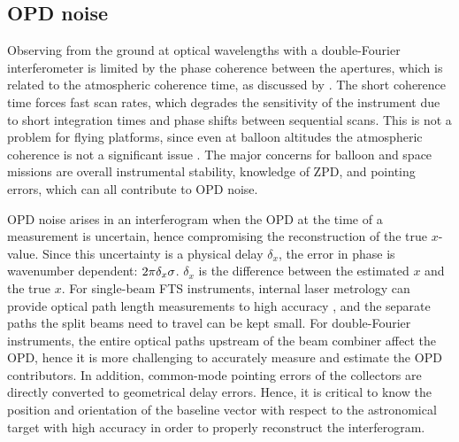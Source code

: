 \subsection{OPD noise}
\label{subsec:phnoise}
Observing from the ground at optical wavelengths with a double-Fourier interferometer is limited by the phase coherence 
between the apertures, which is related to the atmospheric coherence time, as discussed by \cite{Mariotti:1988vea}. The short coherence time forces fast scan rates, which degrades the sensitivity of the instrument due to short integration times and phase shifts between sequential scans. 
This is not a problem for flying platforms, since even at balloon altitudes the atmospheric coherence is not a significant 
issue \citep{Rizzo:2012jp}. The major concerns for balloon and space missions are overall instrumental stability, knowledge of ZPD, and pointing errors, which can all contribute to OPD noise.

OPD noise arises in an interferogram when the OPD at the time of a measurement is uncertain, hence compromising the reconstruction of the true $x$-value. Since this uncertainty is a physical delay $\delta_x$, 
the error in phase is wavenumber dependent: $2\pi\delta_x\sigma$. $\delta_x$ is the difference between the estimated $x$
and the true $x$.
For single-beam FTS instruments, internal laser metrology can provide optical path length 
measurements to high accuracy \citep[e.g.][]{Griffiths:2007uu}, and the separate paths the split beams need to travel can be kept small. 
For double-Fourier instruments, the entire optical paths upstream of the beam combiner affect the OPD, hence it is more challenging to accurately measure and estimate the OPD contributors. 
In addition, common-mode pointing errors of the collectors are directly converted to geometrical delay errors. 
Hence, it is critical to know the position and orientation of the baseline vector with respect to the 
astronomical target with high accuracy in order to properly reconstruct the interferogram.

